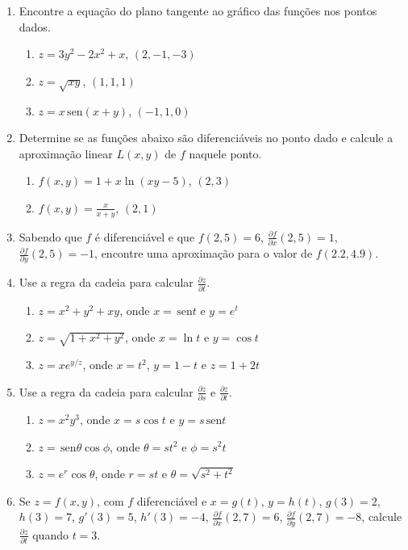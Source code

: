 \documentclass[a4paper,5pt]{amsbook}
\newcommand{\sen}{\,\mbox{sen}}
\newcommand{\ds}{\displaystyle}
\begin{document}
\vspace{1cm}
\begin{enumerate}
    \setlength\itemsep{0.5cm}
    \item Encontre a equa\c{c}\~ao do plano tangente ao gr\'afico das fun\c{c}\~oes nos
    pontos dados.
        \begin{enumerate}
            \setlength\itemsep{0.5cm}
            \item $z=3y^2-2x^2+x$, $(2,-1,-3)$
            \item $z=\sqrt{xy}$, $(1,1,1)$
            \item $z=x \sen{(x+y)}$, $(-1,1,0)$
        \end{enumerate}

    \item Determine se as fun\c{c}\~oes abaixo s\~ao diferenci\'aveis no ponto dado e
    calcule a aproxima\c{c}\~ao linear $L(x,y)$ de $f$ naquele ponto.
        \begin{enumerate}
            \setlength\itemsep{0.5cm}
            \item $f(x,y) = 1+x\ln{(xy-5)}$, $(2,3)$
            \item $f(x,y) = \ds\frac{x}{x+y}$, $(2,1)$
        \end{enumerate}

    \item Sabendo que $f$ \'e diferenci\'avel e que $f(2,5)=6$, $\ds\frac{\partial
    f}{\partial x}(2,5)=1$, $\ds\frac{\partial f}{\partial y}(2,5)=-1$,
    encontre uma aproxima\c{c}\~ao para o valor de $f(2.2, 4.9)$.

    \item Use a regra da cadeia para calcular $\ds\frac{\partial z}{\partial t}$.
        \begin{enumerate}
            \setlength\itemsep{0.5cm}
            \item $z=x^2+y^2+xy$, onde $x=\sen{t}$ e $y=e^t$
            \item $z=\sqrt{1+x^2+y^2}$, onde $x=\ln{t}$ e $y=\cos{t}$
            \item $z=xe^{y/z}$, onde $x=t^2$, $y=1-t$ e $z=1+2t$
        \end{enumerate}

    \item Use a regra da cadeia para calcular $\ds\frac{\partial z}{\partial
    s}$ e $\ds\frac{\partial z}{\partial t}$.
        \begin{enumerate}
            \setlength\itemsep{0.5cm}
            \item $z=x^2y^3$, onde $x=s\cos{t}$ e $y=s \sen{t}$
            \item $z=\sen{\theta}\cos{\phi}$, onde $\theta=st^2$ e $\phi=s^2t$
            \item $z=e^r \cos{\theta}$, onde $r=st$ e $\theta=\sqrt{s^2+t^2}$
        \end{enumerate}

    \item Se $z=f(x,y)$, com $f$ diferenci\'avel e $x=g(t)$, $y=h(t)$, $g(3)=2$,
    $h(3)=7$, $g'(3)=5$, $h'(3)=-4$, $\ds\frac{\partial f}{\partial x}(2,7)=6$,
    $\ds\frac{\partial f}{\partial y}(2,7)=-8$, calcule $\ds\frac{\partial
    z}{\partial t}$ quando $t=3$.
\end{enumerate}
\end{document}
